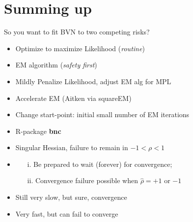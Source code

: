 \documentclass[10pt]{beamer}
\providecommand{\tightlist}{%
\setlength{\itemsep}{0pt}\setlength{\parskip}{0pt}}
\begin{document}
\section*{Summing up}

\begin{frame}[fragile]{So you want to fit BVN to two competing risks?}
\protect\hypertarget{so-you-want-to-fit-bvn-to-two-competing-risks}{}
\begin{itemize}
\tightlist
\item<1->
  Optimize to maximize Likelihood (\emph{routine})
  \item<2-> EM algorithm (\emph{safety first}) 
  \item<3-> Mildly
Penalize Likelihood, adjust EM alg for MPL
  \item<4-> Accelerate EM (Aitken via squareEM)
  \item<5-> Change start-point: initial small number of
EM iterations 
  \item<6-> R-package \textbf{bnc}
\end{itemize}

\begin{itemize}
\item<1> Singular Hessian, failure to remain in $-1 < \rho < 1$ 
\item<2>
  \begin{enumerate}
  \item[i.] Be prepared to wait (forever) for convergence;
  \item[ii.] Convergence failure possible when $\hat{\rho} = +1$ or $-1$
  \end{enumerate}
\item<3> Still very slow, but sure, convergence
\item<4> Very fast, but can fail to converge
\end{itemize}
\end{frame}
\end{document}
